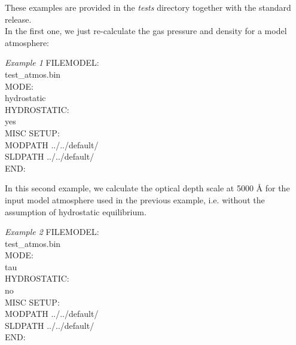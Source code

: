 %

These examples are provided in the {\it tests} directory together with the standard release.\\

In the first one, we just re-calculate the gas pressure and density for a model atmosphere:

\begin{ifbox}[label={tb:example01}]{{\it Example 1}}
  \scriptsize
FILEMODEL:\\
test\_atmos.bin\\
MODE:\\
hydrostatic\\
HYDROSTATIC:\\
yes\\
MISC SETUP:\\
MODPATH ../../default/\\
SLDPATH ../../default/\\
END:
  \normalsize
\end{ifbox}


%

In this second example, we calculate the optical depth scale at 5000 {\AA} for the input model atmosphere used in the previous example, i.e. without the assumption of hydrostatic equilibrium.\\

\begin{ifbox}[label={tb:example02}]{{\it Example 2}}
  \scriptsize
FILEMODEL:\\
test\_atmos.bin\\
MODE:\\
tau\\
HYDROSTATIC:\\
no\\
MISC SETUP:\\
MODPATH ../../default/\\
SLDPATH ../../default/\\
END:
  \normalsize
\end{ifbox}


%

